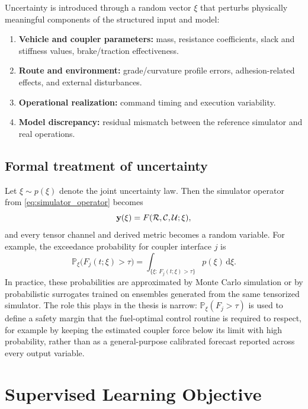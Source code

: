 Uncertainty is introduced through a random vector $\xi$ that perturbs physically meaningful components of the structured input and model:
\begin{enumerate}
    \item \textbf{Vehicle and coupler parameters:} mass, resistance coefficients, slack and stiffness values, brake/traction effectiveness.
    \item \textbf{Route and environment:} grade/curvature profile errors, adhesion-related effects, and external disturbances.
    \item \textbf{Operational realization:} command timing and execution variability.
    \item \textbf{Model discrepancy:} residual mismatch between the reference simulator and real operations.
\end{enumerate}

\subsection{Formal treatment of uncertainty}

Let $\xi\sim p(\xi)$ denote the joint uncertainty law.
Then the simulator operator from \cref{eq:simulator_operator} becomes
\begin{equation}
    \mathbf{y}(\xi)=F(\mathcal{R},\mathcal{C},\mathcal{U};\xi),
    \label{eq:probabilistic_simulator}
\end{equation}
and every tensor channel and derived metric becomes a random variable.
For example, the exceedance probability for coupler interface $j$ is
\begin{equation}
    \mathbb{P}_{\xi}\!\bigl(F_j(t;\xi)>\tau\bigr)
    =\int_{\{\xi:\,F_j(t;\xi)>\tau\}}p(\xi)\,\mathrm{d}\xi.
    \label{eq:exceedance_prob_formal}
\end{equation}
In practice, these probabilities are approximated by Monte Carlo simulation or by probabilistic surrogates trained on ensembles generated from the same tensorized simulator.
The role this plays in the thesis is narrow: $\mathbb{P}_\xi(F_j > \tau)$ is used to define a safety margin that the fuel-optimal control routine is required to respect, for example by keeping the estimated coupler force below its limit with high probability, rather than as a general-purpose calibrated forecast reported across every output variable.

\section{Supervised Learning Objective}

